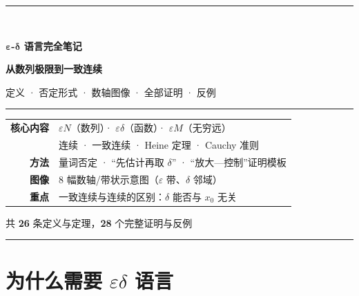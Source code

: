 \documentclass[11pt,a4paper]{ctexart}
\providecommand{\kaishu}{}
\renewcommand{\kaishu}{\CJKfamily{kai}}
\theoremstyle{definition}
\theoremstyle{remark}
\begin{document}
\begin{titlepage}
\centering
\vspace*{2.4cm}

{\color{mainc}\rule{\linewidth}{1.6pt}}\\[0.9cm]

{\Huge\bfseries $\boldsymbol{\varepsilon}$-$\boldsymbol{\delta}$ 语言完全笔记\par}
\vspace{0.5cm}
{\LARGE\bfseries 从数列极限到一致连续\par}
\vspace{0.35cm}
{\large 定义 · 否定形式 · 数轴图像 · 全部证明 · 反例\par}

\vspace{0.6cm}
{\color{mainc}\rule{\linewidth}{1.6pt}}

\vspace{2.4cm}

{\large\kaishu
\begin{tabular}{rl}
\textbf{核心内容} & $\varepsilon$\text{-}$N$（数列）· $\varepsilon$\text{-}$\delta$（函数）· $\varepsilon$\text{-}$M$（无穷远）\\[4pt]
                & 连续 · 一致连续 · Heine 定理 · Cauchy 准则\\[4pt]
\textbf{方法}   & 量词否定 · “先估计再取 $\delta$” · “放大—控制”证明模板\\[4pt]
\textbf{图像}   & 8 幅数轴/带状示意图（$\varepsilon$ 带、$\delta$ 邻域）\\[4pt]
\textbf{重点}   & 一致连续与连续的区别：$\delta$ 能否与 $x_0$ 无关\\[4pt]
\end{tabular}}

\vfill

{\large 共 \textbf{26} 条定义与定理，\textbf{28} 个完整证明与反例}

\vspace{1.0cm}
{\color{mainc}\rule{0.45\linewidth}{0.8pt}}
\end{titlepage}

\tableofcontents
\newpage

\section{为什么需要 $\varepsilon$\text{-}$\delta$ 语言}
\end{document}
